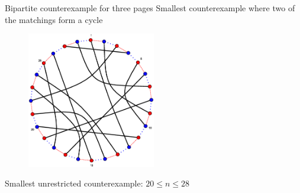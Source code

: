 \begin{frame}{Bipartite counterexample for three pages}
Smallest counterexample where two of the matchings form a cycle\vspace{-1em}
\begin{figure}[\placement]
\centering
\includegraphics[width=0.5\textwidth]{../thesis/figures/two_cycles.eps}
\end{figure}
\vspace{-1em} Smallest unrestricted counterexample: $20 \leq n \leq 28$
\end{frame}

